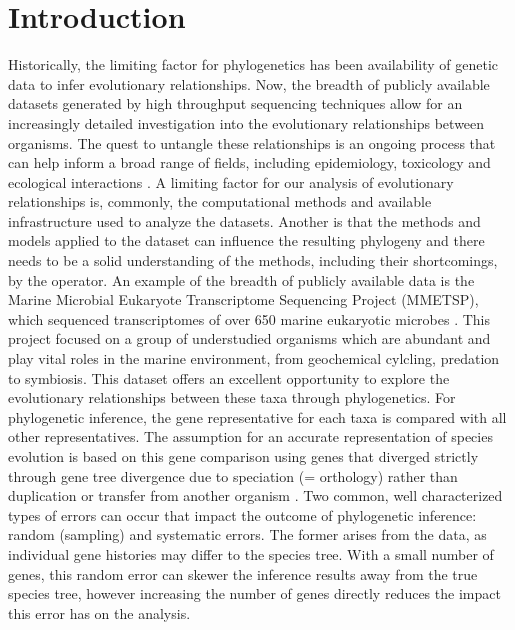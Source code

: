 \documentclass[12pt]{article}
\begin{document}
\section{Introduction}
Historically, the limiting factor for phylogenetics has been availability of genetic data to infer evolutionary relationships.
Now, the breadth of publicly available datasets generated by high throughput sequencing techniques allow for an increasingly detailed investigation into the evolutionary relationships between organisms.
The quest to untangle these relationships is an ongoing process that can help inform a broad range of fields, including epidemiology, toxicology and ecological interactions \cite{mctavish2017and}. %
A limiting factor for our analysis of evolutionary relationships is, commonly, the computational methods and available infrastructure used to analyze the datasets. 
Another is that the methods and models applied to the dataset can influence the resulting phylogeny and there needs to be a solid understanding of the methods, including their shortcomings, by the operator.
An example of the breadth of publicly available data is the Marine Microbial Eukaryote Transcriptome Sequencing Project (MMETSP), which sequenced transcriptomes of over 650 marine eukaryotic microbes \cite{keeling2014marine}. 
This project focused on a group of understudied organisms which are abundant and play vital roles in the marine environment, from geochemical cylcling, predation to symbiosis. 
This dataset offers an excellent opportunity to explore the evolutionary relationships between these taxa through phylogenetics. 
For phylogenetic inference, the gene representative for each taxa is compared with all other representatives. 
The assumption for an accurate representation of species evolution is based on this gene comparison using genes that diverged strictly through  gene tree divergence due to speciation (= orthology) rather than duplication or transfer from another organism \cite{maddison1997gene}. 
Two common, well characterized types of errors can occur that impact the outcome of phylogenetic inference: random (sampling) and systematic errors. 
The former arises from the data, as individual gene histories may differ to the species tree. 
With a small number of genes, this random error can skewer the inference results away from the true species tree, however increasing the number of genes directly reduces the impact this error has on the analysis. 
\end{document}
